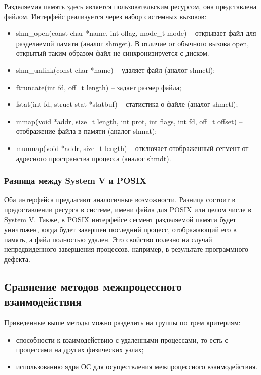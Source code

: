Разделяемая память здесь является пользовательским ресурсом, она представлена файлом.
Интерфейс реализуется через набор системных вызовов:
\begin{itemize}
\item shm\_open(const char *name, int oflag, mode\_t mode) -- открывает файл для разделяемой памяти (аналог shmget). В отличие от обычного вызова open, открытый таким образом файл не синхронизируется с диском.
\item shm\_unlink(const char *name) -- удаляет файл (аналог shmctl);
\item ftruncate(int fd, off\_t length) -- задает размер файла;
\item fstat(int fd, struct stat *statbuf) -- статистика о файле (аналог shmctl);
\item mmap(void *addr, size\_t length, int prot, int flags, int fd, off\_t offset) -- отображение файла в памяти (аналог shmat);
\item munmap(void *addr, size\_t length) -- отключает отображенный сегмент от адресного пространства процесса (аналог shmdt).
\end{itemize}

\subsubsection{Разница между System V и POSIX}
Оба интерфейса предлагают аналогичные возможности. Разница состоит в предоставлении ресурса в системе, имени файла для POSIX или целом числе в System V. Также, в POSIX интерфейсе сегмент разделяемой памяти будет уничтожен, когда будет завершен последний процесс, отображающий его в память, а файл полностью удален. Это свойство полезно на случай непредвиденного завершения процессов, например, в результате программного дефекта.

\subsection{Сравнение методов межпроцессного взаимодействия}

Приведенные выше методы можно разделить на группы по трем критериям:
\begin{itemize} 
\item способности к взаимодействию с удаленными процессами, то есть с процессами на других физических узлах;
\item использованию ядра ОС для осуществления межпроцессного взаимодействия.
\end{itemize}

